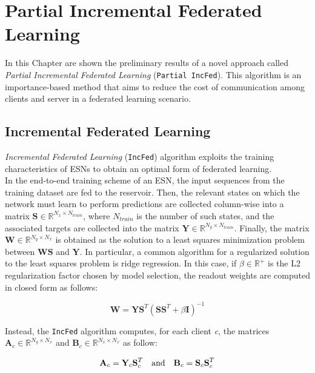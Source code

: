 \chapter{Partial Incremental Federated Learning}\label{chapter:appendix_b}

In this Chapter are shown the preliminary results of a novel approach called \textit{Partial Incremental Federated Learning} (\texttt{Partial IncFed}). This algorithm is an importance-based method that aims to reduce the cost of communication among clients and server in a federated learning scenario.

\section{Incremental Federated Learning}

\textit{Incremental Federated Learning} (\texttt{IncFed}) algorithm exploits the training characteristics of ESNs to obtain an optimal form of federated learning.\\

In the end-to-end training scheme of an ESN, the input sequences from the training dataset are fed to the reservoir. Then, the relevant states on which the network must learn to perform predictions are collected column-wise into a matrix $\textbf{S}\in \mathbb{R}^{N_x\times N_{train}}$, where $N_{train}$ is the number of such states, and the associated targets are collected into the matrix $\textbf{Y}\in \mathbb{R}^{N_y\times N_{train}}$. Finally, the matrix $\textbf{W}\in\mathbb{R}^{N_y \times N_x}$ is obtained as the solution to a least squares minimization problem between $\textbf{WS}$ and $\textbf{Y}$. 
In particular, a common algorithm for a regularized solution to the least squares problem is ridge regression. In this case, if $\beta\in \mathbb{R}^+$ is the L2 regularization factor chosen by model selection, the readout weights are computed in closed form as follows:

\begin{equation}\label{eq:w}
    \textbf{W}=\textbf{Y}\textbf{S}^T(\textbf{S}\textbf{S}^T+\beta\textbf{I})^{-1}
\end{equation}

Instead, the \texttt{IncFed} algorithm computes, for each client \textit{c}, the matrices $\textbf{A}_c\in \mathbb{R}^{N_y\times N_x}$ and $\textbf{B}_c\in \mathbb{R}^{N_x\times N_x}$ as follow:

\begin{equation}\label{eq:ab}
    \textbf{A}_c=\textbf{Y}_c\textbf{S}_c^T\text{\quad and\quad}\textbf{B}_c=\textbf{S}_c\textbf{S}_c^T
\end{equation}

